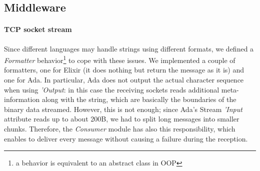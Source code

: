 \subsection{Middleware}\label{sec:impl-mw}

\paragraph{TCP socket stream}

Since different languages may handle strings using different formats,
we defined a \textit{Formatter} behavior\footnote{a behavior
is equivalent to an abstract class in OOP} to cope with these
issues.
We implemented a couple of formatters, one for Elixir (it does nothing but
return the message as it is) and one for Ada. In particular, Ada does not
output the actual character sequence when using \textit{'Output}: in this case
the receiving sockets reads additional meta-information along with the string,
which are basically the boundaries of the binary data streamed.
However, this is not enough; since Ada's Stream \textit{'Input} attribute
reads up to about 200B, we had to split long messages into smaller
chunks. Therefore, the
\textit{Consumer} module has also this responsibility, which enables
to deliver every message without causing a failure during the reception.
